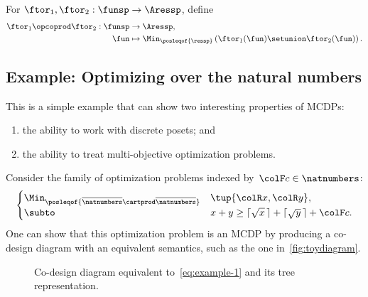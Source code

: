 \begin{definition}
    \label{def:opcoprod}
    For $\ftor_{1},\ftor_{2}:\funsp\rightarrow\Aressp$,
    define
    \begin{align*}
        \ftor_{1}\opcoprod\ftor_{2}:\funsp & \rightarrow\Aressp, \\
        \fun                               & \mapsto\Min_{\posleqof{\ressp}}\left(\ftor_{1}(\fun)\setunion\ftor_{2}(\fun)\right).
    \end{align*}
\end{definition}

\subsection{Example: Optimizing over the natural numbers}

This is a simple example that can show two interesting properties of MCDPs:
\begin{enumerate}
    \item the ability to work with discrete posets; and
    \item the ability to treat multi-objective optimization problems.
\end{enumerate}
Consider the family of optimization problems indexed by~${\colF c}\in\natnumbers$:
\begin{equation}
    \begin{cases}
        \Min_{\posleqof{\overline{\natnumbers}\cartprod\overline{\natnumbers}}} & \tup{ {\colR x},{\colR y}} ,                                    \\
        \subto                                                                  & x+y\geq\lceil\sqrt{x}\,\rceil+\lceil\sqrt{y}\,\rceil+{\colF c}.
    \end{cases}\label{eq:example-1}
\end{equation}
One can show that this optimization problem is an MCDP by producing a co-design diagram with an equivalent semantics, such as the one in~\cref{fig:toydiagram}.

\begin{figure}[h]

    \caption{Co-design diagram equivalent to~\cref{eq:example-1} and its tree representation.}
\end{figure}

